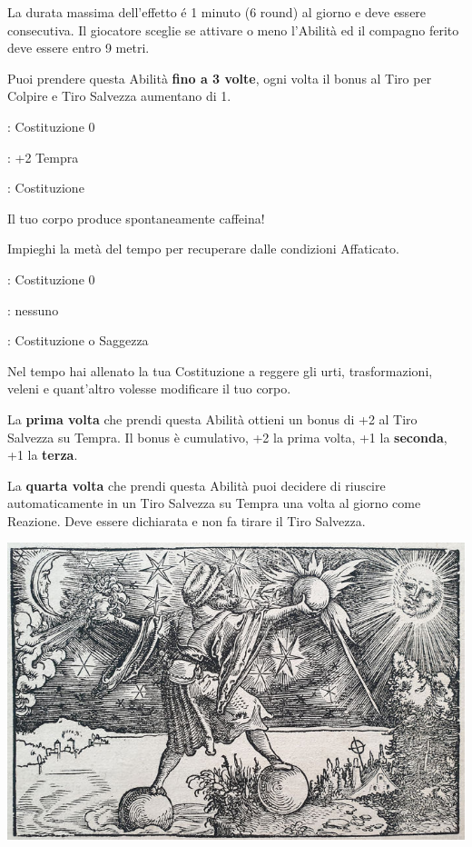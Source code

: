 \begin{multicols}{2}
La durata massima dell'effetto é 1 minuto (6 round) al giorno e deve essere consecutiva. Il giocatore sceglie se attivare o meno l'Abilità ed il compagno ferito deve essere entro 9 metri.

Puoi prendere questa Abilità \textbf{fino a 3 volte}, ogni volta il bonus al Tiro per Colpire e Tiro Salvezza aumentano di 1.

\begin{description}[noitemsep, topsep=0pt, parsep=0pt, partopsep=0pt, leftmargin=0cm, labelwidth=2.5cm]
    \item[\textbf{Requisito}]: Costituzione 0
    \item[\textbf{Tiri Salvezza}]: +2 Tempra
    \item[\textbf{Caratteristica}]: Costituzione
\end{description}

Il tuo corpo produce spontaneamente caffeina!

Impieghi la metà del tempo per recuperare dalle condizioni Affaticato.

\begin{description}[noitemsep, topsep=0pt, parsep=0pt, partopsep=0pt, leftmargin=0cm, labelwidth=2.5cm]
    \item[\textbf{Requisito}]: Costituzione 0
    \item[\textbf{Tiri Salvezza}]: nessuno
    \item[\textbf{Caratteristica}]: Costituzione o Saggezza
\end{description}

Nel tempo hai allenato la tua Costituzione a reggere gli urti, trasformazioni, veleni e quant'altro volesse modificare il tuo corpo.

La \textbf{prima volta} che prendi questa Abilità ottieni un bonus di +2 al Tiro Salvezza su Tempra. Il bonus è cumulativo, +2 la prima volta, +1 la \textbf{seconda}, +1 la \textbf{terza}.

La \textbf{quarta volta} che prendi questa Abilità puoi decidere di riuscire automaticamente in un Tiro Salvezza su Tempra una volta al giorno come Reazione. Deve essere dichiarata e non fa tirare il Tiro Salvezza.

\begin{center}
	\includegraphics[width=0.9\linewidth]{immagini/Historia_Mundi_Naturalis.png}


\end{center}
\end{multicols}
